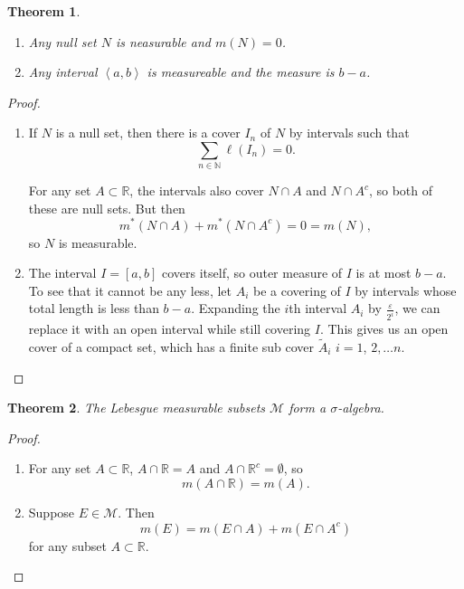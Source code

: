 \documentclass[a4paper,12pt]{scrreprt}
\newcommand{\R}{\mathbb{R}}
\newcommand{\N}{\mathbb{N}}
\theoremstyle{definition}
\theoremstyle{plain}
\newtheorem{theorem}{Theorem}[section]
\theoremstyle{remark}
\begin{document}
\begin{theorem}
  \label{thm:nullsetsandintervalsarelebesguemeasurable}
  $\,$
  \begin{enumerate}
    \item Any null set $N$ is neasurable and $m(N) = 0$.

    \item Any interval $\left\langle a, b \right\rangle$ is measureable and the measure is $b-a$.
  \end{enumerate}
\end{theorem}
\begin{proof}
  $\,$
  \begin{enumerate}
    \item If $N$ is a null set, then there is a cover $I_{n}$ of $N$ by intervals such that
      \begin{equation*}
        \sum_{n \in \N} \ell(I_{n}) = 0.
      \end{equation*}

      For any set $A \subset \R$, the intervals also cover $N \cap A$ and $N \cap A^{c}$, so both of these are null sets. But then
      \begin{equation*}
        m^{*}(N \cap A) + m^{*}(N \cap A^{c}) = 0 = m(N),
      \end{equation*}
      so $N$ is measurable.

    \item The interval $I = [a, b]$ covers itself, so outer measure of $I$ is at most $b - a$. To see that it cannot be any less, let $A_{i}$ be a covering of $I$ by intervals whose total length is less than $b-a$. Expanding the $i$th interval $A_{i}$ by $\frac{\varepsilon}{2^{i}}$, we can replace it with an open interval while still covering $I$. This gives us an open cover of a compact set, which has a finite sub cover $\tilde{A}_{i}$ $i = 1$, $2, \ldots n$.
  \end{enumerate}
\end{proof}

\begin{theorem}
  The Lebesgue measurable subsets $\mathcal{M}$ form a $\sigma$-algebra.
\end{theorem}
\begin{proof}
  $\,$
  \begin{enumerate}
    \item For any set $A \subset \R$, $A \cap \R = A$ and $A \cap \R^{c} = \emptyset$, so
      \begin{equation*}
        m(A \cap \R) = m(A).
      \end{equation*}

    \item Suppose $E \in \mathcal{M}$. Then
      \begin{equation*}
        m(E) = m(E \cap A) + m(E \cap A^{c})
      \end{equation*}
      for any subset $A \subset \R$.
  \end{enumerate}
\end{proof}
\end{document}
